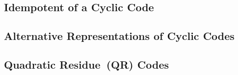 \documentclass{article}
\renewcommand{\=}{\equiv}
\begin{document}
\subsection{Idempotent of a Cyclic Code}

\subsection{Alternative Representations of Cyclic Codes}

\subsection{Quadratic Residue (QR) Codes}
\end{document}
